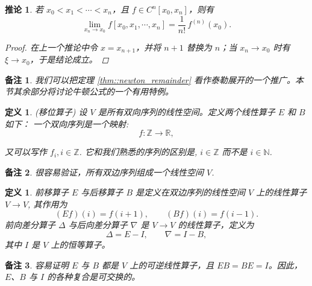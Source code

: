 \documentclass[a4paper]{ctexart}
\newtheorem{remark}{备注}
\newtheorem{definition}[theorem]{定义} %
\newtheorem{corollary}[theorem]{推论}
\numberwithin{theorem}{section}
\numberwithin{equation}{section}
\numberwithin{figure}{section}
\numberwithin{remark}{section}
\begin{document}
\begin{corollary}
    \label{cor::newton_limit}
若 $x_0<x_1<\cdots<x_n$，且 $f\in C^{n}[x_0,x_n]$，则有
\begin{equation}
\lim_{x_n\to x_0} f[x_0,x_1,\cdots,x_n]=\frac{1}{n!}\,f^{(n)}(x_0).
\end{equation}
\begin{proof}
在上一个推论中令 $x=x_{n+1}$，并将 $n+1$ 替换为 $n$；当 $x_n\to x_0$ 时有 $\xi\to x_0$，于是结论成立。
\end{proof}
\end{corollary}

\begin{remark}
我们可以把定理 \ref{thm::newton_remainder} 看作泰勒展开的一个推广。本节其余部分将讨论牛顿公式的一个有用特例。
\end{remark}

\begin{definition}
    \label{def::shift_operators}
(移位算子) 设 $V$ 是所有双向序列的线性空间。定义两个线性算子 $E$ 和 $B$ 如下：
一个双向序列是一个映射: 
$$
f : \mathbb{Z} \to \mathbb{R},
$$

又可以写作 $f_i, i \in \mathbb{Z}$. 它和我们熟悉的序列的区别是, $i \in
\mathbb{Z}$ 而不是 $i \in \mathbb{N}$.
    
\end{definition}

\begin{remark}
很容易验证，所有双边序列组成一个线性空间 $V$.
\end{remark}

\begin{definition}
    \label{def::difference_operators}
前移算子 $E$ 与后移算子 $B$ 是定义在双边序列的线性空间 $V$ 上的线性算子 $V\to V$, 其作用为
\begin{equation}
(Ef)(i)=f(i+1), \qquad (Bf)(i)=f(i-1).
\end{equation}
前向差分算子 $\Delta$ 与后向差分算子 $\nabla$ 是 $V\to V$ 的线性算子，定义为
\begin{equation}
    \label{eq::difference_operators}
\Delta=E-I, \qquad \nabla=I-B,
\end{equation}
其中 $I$ 是 $V$ 上的恒等算子。
\end{definition}

\begin{remark}
容易证明 $E$ 与 $B$ 都是 $V$ 上的可逆线性算子，且 $EB=BE=I$。因此，$E$、$B$ 与 $I$ 的各种复合是可交换的。
\end{remark}
\end{document}

